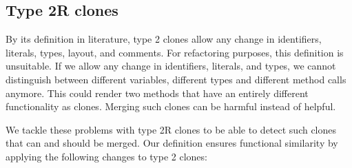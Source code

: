 \documentclass[a4paper]{article}
\begin{document}
\subsection{Type 2R clones}
By its definition in literature, type 2 clones allow any change in identifiers, literals, types, layout, and comments. For refactoring purposes, this definition is unsuitable. If we allow any change in identifiers, literals, and types, we cannot distinguish between different variables, different types and different method calls anymore. This could render two methods that have an entirely different functionality as clones. Merging such clones can be harmful instead of helpful.

We tackle these problems with type 2R clones to be able to detect such clones that can and should be merged. Our definition ensures functional similarity by applying the following changes to type 2 clones:
\end{document}
